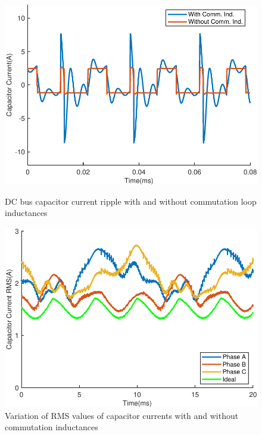 \begin{figure}[tb]
  \includegraphics[width=\linewidth]{figures/single_module_curr_ripple.pdf}
  \caption{DC bus capacitor current ripple with and without commutation loop inductances}\label{fig:single_module_curr_ripple}
\endminipage\hfill
{}
  \includegraphics[width=\linewidth]{figures/CapacitorCurrentRMS.pdf}
  \caption{Variation of RMS values of capacitor currents with and without commutation inductances}\label{fig:CapacitorCurrentRMS}
\endminipage
\end{figure}


